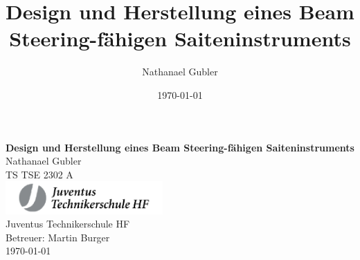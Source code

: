 \documentclass{report}
\title{Design und Herstellung eines Beam Steering-fähigen Saiteninstruments}
\author{Nathanael Gubler}
\date{\today}
\begin{document}
\begin{titlepage}
	\thispagestyle{empty} %
	\begin{center}
		 \vspace*{75pt} %
		
		{ \huge \textbf{Design und Herstellung eines Beam Steering-fähigen Saiteninstruments}} 			\\ [0.5cm]
		{\Large Nathanael Gubler}\\TS TSE 2302 A\\ [1.0cm]
		\includegraphics[width=6.0cm]{./pictures/JuventusLogo.pdf} 	\\ [0.5cm]
		{\large Juventus Technikerschule HF\\Betreuer: Martin Burger} 			\\ [0.5cm]
		{\large \today} 											\\ [1.0cm]
		\vspace*{-700pt}
		
	\end{center}
\end{titlepage}

\newpage
\setcounter{secnumdepth}{3} %
\setcounter{tocdepth}{3}    %
\setlength{\cftbeforetoctitleskip}{5pt} %
\setlength{\cftaftertoctitleskip}{15pt} %
\tableofcontents

\newpage
\setlength{\cftbeforeloftitleskip}{0pt} %
\setlength{\cftafterloftitleskip}{15pt} %
\listoffigures
{}  %

\newpage
\vspace{2mm}
\end{document}
